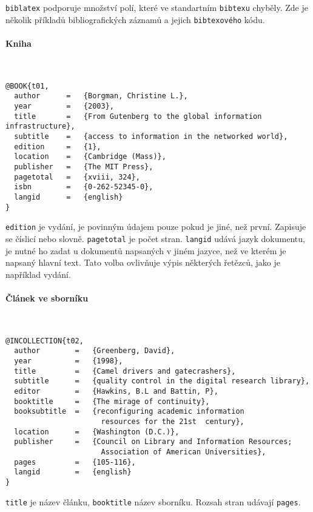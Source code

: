 \documentclass[a4paper,10pt]{ltxdockit}
\def\t|#1|{\texttt{#1}}
\def\c#1{%
\hangpara{3em}{1}%
\fullcite{#1}}
\begin{document}
\t|biblatex| podporuje množství polí, které ve standartním \t|bibtexu| chyběly.
Zde je několik příkladů bibliografických záznamů a jejich \t|bibtexového| kódu.


\paragraph{Kniha} \hfill\\

\c{t01}
\begin{verbatim}
@BOOK{t01,
  author      =   {Borgman, Christine L.}, 
  year        =   {2003},
  title       =   {From Gutenberg to the global information infrastructure}, 
  subtitle    =   {access to information in the networked world},
  edition     =   {1},
  location    =   {Cambridge (Mass)}, 
  publisher   =   {The MIT Press},
  pagetotal   =   {xviii, 324},
  isbn        =   {0-262-52345-0},
  langid      =   {english}
}
\end{verbatim} 

\t|edition| je vydání, je povinným údajem pouze pokud je jiné, než první.
Zapisuje se číslicí nebo slovně. \t|pagetotal| je počet stran. \t|langid| udává
jazyk dokumentu, je nutné ho zadat u dokumentů napsaných v jiném jazyce, než ve kterém
je napsaný hlavní text. Tato volba ovlivňuje výpis některých řetězců, jako je
například vydání.

\paragraph{Článek ve sborníku} \hfill\\

\c{t02}
\begin{verbatim}
@INCOLLECTION{t02,
  author        =   {Greenberg, David}, 
  year          =   {1998},
  title         =   {Camel drivers and gatecrashers},
  subtitle      =   {quality control in the digital research library},
  editor        =   {Hawkins, B.L and Battin, P},
  booktitle     =   {The mirage of continuity},
  booksubtitle  =   {reconfiguring academic information 
                      resources for the 21st  century}, 
  location      =   {Washington (D.C.)}, 
  publisher     =   {Council on Library and Information Resources; 
                      Association of American Universities}, 
  pages         =   {105-116},
  langid        =   {english}
}
\end{verbatim} 
 \t|title| je název článku, \t|booktitle| název sborníku. Rozsah stran udávají \t|pages|.
 
\end{document}
